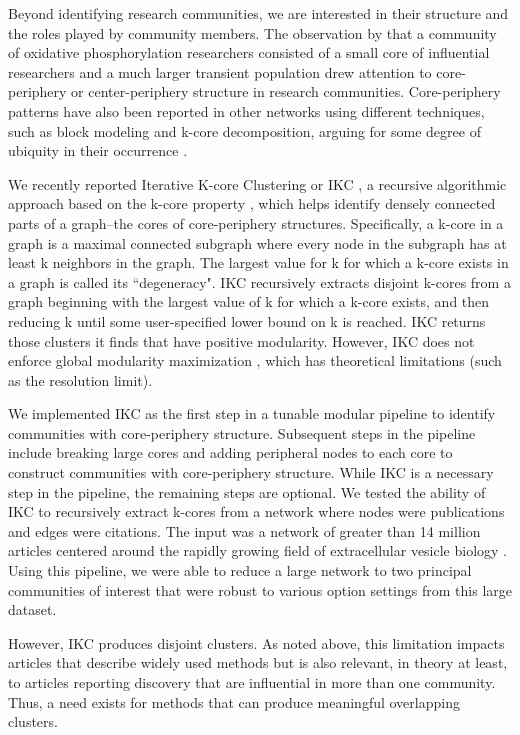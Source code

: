 \documentclass[12pt, oneside]{article}   	%
\begin{document}
Beyond identifying research communities, we are interested in their structure and the roles played by community members.  The observation by \cite{Price1966} that a community of oxidative phosphorylation researchers consisted of a small core of influential researchers and a much larger transient population drew attention to core-periphery or center-periphery structure in research communities. Core-periphery patterns have also been reported in other networks using different techniques, such as block modeling and k-core decomposition, arguing for some degree of ubiquity in their occurrence \citep{borgatti2000models,Breiger2014,Rombach2017,gallagher2021clarified,yanchenko_2202.04455}. 	

We recently reported Iterative K-core Clustering or IKC \citep{Wedell2022}, a recursive algorithmic approach based on the k-core property \citep{Giatsidis2011,malliaros2019}, which helps identify densely connected parts of a graph--the cores of core-periphery structures. 
Specifically, a k-core in a graph is a maximal connected subgraph where every node in the subgraph has at least k neighbors in the graph.
The largest value for k for which a k-core exists in a graph is called its ``degeneracy". 
IKC recursively extracts disjoint k-cores from a graph beginning with the largest value of k for which a  k-core  exists, and then reducing k until some user-specified lower bound on k is reached. 
IKC returns those clusters it finds that have positive modularity. 
However, 
IKC does not enforce global modularity maximization \citep{lancichinetti2011limits}, which has theoretical limitations (such as the resolution limit). 

We implemented IKC as the first step in a tunable modular pipeline to identify communities with core-periphery structure. 
Subsequent steps in the pipeline include breaking large cores and adding peripheral nodes to each core to construct communities with core-periphery structure. While IKC is a necessary step in the pipeline, the remaining steps are optional. We tested the ability of IKC to recursively extract k-cores from a network where nodes were publications and edges were citations. 
The input was a network of greater than 14 million articles centered around the rapidly growing field of extracellular vesicle biology \citep{Wedell2022}. Using this pipeline, we were able to reduce a large network to two principal communities of interest that were robust to various option settings \citep[Figure 5]{Wedell2022} from this large dataset.
	
However, IKC produces disjoint clusters. As noted above, this limitation impacts articles that describe widely used methods but is also relevant, in theory at least, to articles reporting discovery that are influential in more than one community.  Thus, a need exists for methods that can produce meaningful overlapping clusters. 
	
\end{document}
